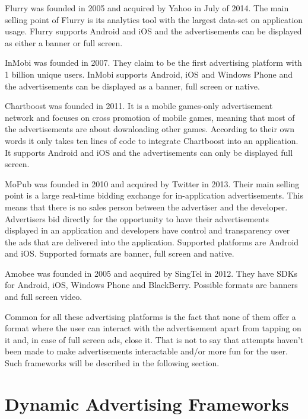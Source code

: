Flurry was founded in 2005 and acquired by Yahoo in July of 2014. \cite{crunchbase-flurry} The main selling point of Flurry is its analytics tool with the largest data-set on application usage. \cite{maps-yankeegroup} Flurry supports Android and iOS and the advertisements can be displayed as either a banner or full screen.

InMobi was founded in 2007. \cite{crunchbase-inmobi} They claim to be the first advertising platform with 1 billion unique users. \cite{inmobi} InMobi supports Android, iOS and Windows Phone \cite{inmobi-monetize} and the advertisements can be displayed as a banner, full screen or native. \cite{inmobi-sdk}

Chartboost was founded in 2011. \cite{crunchbase-chartboost} It is a mobile games-only advertisement network and focuses on cross promotion of mobile games, meaning that most of the advertisements are about downloading other games. According to their own words it only takes ten lines of code to integrate Chartboost into an application. \cite{chartboost} It supports Android and iOS and the advertisements can only be displayed full screen.\cite{hongikiat-monetize}

MoPub was founded in 2010 and acquired by Twitter in 2013. \cite{crunchbase-mopub} Their main selling point is a large real-time bidding exchange for in-application advertisements. This means that there is no sales person between the advertiser and the developer. Advertisers bid directly for the opportunity to have their advertisements displayed in an application and developers have  control and transparency over the ads that are delivered into the application. \cite{mopub-marketplace} Supported platforms are Android and iOS. \cite{mopub-resources} Supported formats are banner, full screen and native.

Amobee was founded in 2005 and acquired by SingTel in 2012. \cite{crunchbase-amobee} They have SDKs for Android, iOS, Windows Phone and BlackBerry. Possible formats are banners and full screen video.

Common for all these advertising platforms is the fact that none of them offer a format where the user can interact with the advertisement apart from tapping on it and, in case of full screen ads, close it. That is not to say that attempts haven’t been made to make advertisements interactable and/or more fun for the user. Such frameworks will be described in the following section.

\section{Dynamic Advertising Frameworks}

